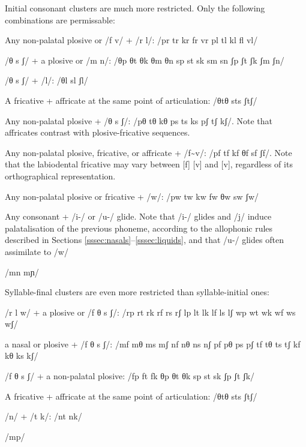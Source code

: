 \documentclass[grammar]{subfiles}
\begin{document}

  Initial consonant clusters are much more restricted. Only the following combinations are permissable:

  \begin{itemize*}
    \item Any non-palatal plosive or /f v/ + /r l/: /pr tr kr fr vr pl tl kl fl vl/ 
    \item /θ s ʃ/ + a plosive or /m n/: /θp θt θk θm θn sp st sk sm sn ʃp ʃt ʃk ʃm ʃn/
    \item /θ s ʃ/ + /l/: /θl sl ʃl/
    \item A fricative + affricate at the same point of articulation: /θtθ sts ʃtʃ/
    \item Any non-palatal plosive + /θ s ʃ/: /pθ tθ kθ ps ts ks pʃ tʃ kʃ/. Note that affricates contrast with plosive-fricative sequences.
    \item Any non-palatal plosive, fricative, or affricate + /f\textasciitilde v/: /pf tf kf θf sf ʃf/. Note that the labiodental fricative may vary between [f] [v] and [v], regardless of its orthographical representation.
    \item Any non-palatal plosive or fricative + /w/: /pw tw kw fw θw sw ʃw/
    \item Any consonant + /i-/ or /u-/ glide. Note that /i-/ glides and /j/ induce palatalisation of the previous phoneme, according to the allophonic rules described in Sections \ref{sssec:nasals}–\ref{sssec:liquids}, and that /u-/ glides often assimilate to /w/
    \item /mn mɲ/
  \end{itemize*}

  Syllable-final clusters are even more restricted than syllable-initial ones:

  \begin{itemize*}
    \item /r l w/ + a plosive or /f θ s ʃ/: /rp rt rk rf rs rʃ lp lt lk lf ls lʃ wp wt wk wf ws wʃ/
    \item a nasal or plosive + /f θ s ʃ/: /mf mθ ms mʃ nf nθ ns nʃ pf pθ ps pʃ tf tθ ts tʃ kf kθ ks kʃ/
    \item /f θ s ʃ/ + a non-palatal plosive: /fp ft fk θp θt θk sp st sk ʃp ʃt ʃk/
    \item A fricative + affricate at the same point of articulation: /θtθ sts ʃtʃ/
    \item /n/ + /t k/: /nt nk/
    \item /mp/
  \end{itemize*}
\end{document}
